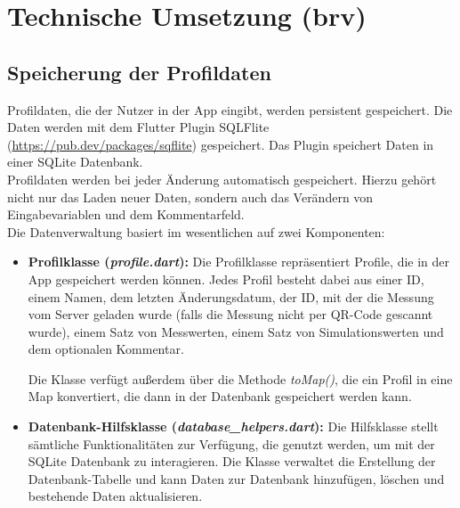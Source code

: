 \chapter{Technische Umsetzung (brv)}
\label{chap:technUmsetzung}

	\section{Speicherung der Profildaten}
	\label{sec:speicherungProfildaten}
	
	Profildaten, die der Nutzer in der App eingibt, werden persistent gespeichert. Die Daten werden mit dem Flutter Plugin SQLFlite (\url{https://pub.dev/packages/sqflite}) gespeichert. Das Plugin speichert Daten in einer SQLite Datenbank.
	\\
	Profildaten werden bei jeder Änderung automatisch gespeichert. Hierzu gehört nicht nur das Laden neuer Daten, sondern auch das Verändern von Eingabevariablen und dem Kommentarfeld.
	\\
	Die Datenverwaltung basiert im wesentlichen auf zwei Komponenten:
	
	\begin{itemize}
		\item \textbf{Profilklasse (\textit{profile.dart}):} Die Profilklasse repräsentiert Profile, die in der App gespeichert werden können. Jedes Profil besteht dabei aus einer ID, einem Namen, dem letzten Änderungsdatum, der ID, mit der die Messung vom Server geladen wurde (falls die Messung nicht per QR-Code gescannt wurde), einem Satz von Messwerten, einem Satz von Simulationswerten und dem optionalen Kommentar.
		
		Die Klasse verfügt außerdem über die Methode \textit{toMap()}, die ein Profil in eine Map konvertiert, die dann in der Datenbank gespeichert werden kann.				

		\item \textbf{Datenbank-Hilfsklasse (\textit{database\_helpers.dart}):} Die Hilfsklasse stellt sämtliche Funktionalitäten zur Verfügung, die genutzt werden, um mit der SQLite Datenbank zu interagieren. Die Klasse verwaltet die Erstellung der Datenbank-Tabelle und kann Daten zur Datenbank hinzufügen, löschen und bestehende Daten aktualisieren.
		
	\end{itemize}

